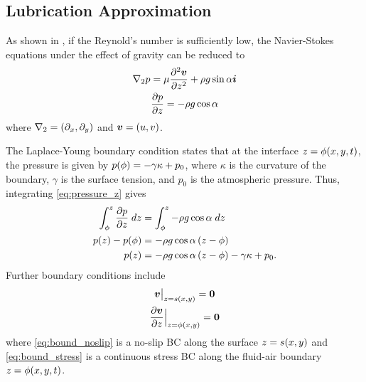 \subsection{Lubrication Approximation}
As shown in \cite{kondic2003instabilities}, if the Reynold's number is sufficiently low, the Navier-Stokes equations under the effect of gravity can be reduced to 
\begin{gather}
    \nabla_2 p = \mu \frac{\partial^2 \boldsymbol{v}}{\partial z^2} + \rho g \sin\alpha \boldsymbol{i} 
    \label{eq:pressure_grad}\\
    \frac{\partial p}{\partial z} = -\rho g \cos \alpha
    \label{eq:pressure_z}
\end{gather}
where $\nabla_2 = \left( \partial_x, \partial_y \right)$ and $\boldsymbol{v} = \left( u, v \right)$.

The Laplace-Young boundary condition states that at the interface $z = \phi\!\left( x, y, t \right)$, the pressure is given by 
$p\!\left( \phi \right) = -\gamma \kappa + p_0$, where $\kappa$ is the curvature of the boundary, $\gamma$ is the surface tension, and $p_0$ is the atmospheric pressure. 
Thus, integrating \cref{eq:pressure_z} gives 
\begin{align}
    \nonumber \int_{\phi}^{z} \frac{\partial p}{\partial z} \; dz &=  \int_{\phi}^{z} -\rho g \cos \alpha \; dz\\
    \nonumber p\!\left( z \right) - p\!\left( \phi \right) &= -\rho g \cos \alpha \left( z - \phi \right)\\
    p\!\left( z \right) &= -\rho g \cos \alpha \left( z - \phi \right) -\gamma \kappa + p_0.  
    \label{eq:laplace_young}
\end{align}
Further boundary conditions include 
\begin{gather}
    \evalat{\vect{v}}{z = s\lrp{x,y}} = \vect{0} 
    \label{eq:bound_noslip}\\
    \evalat[\Big]{\pderiv{\vect{v}}{z}}{z = \phi\lrp{x,y}} = \vect{0} 
    \label{eq:bound_stress}
\end{gather}
where \cref{eq:bound_noslip} is a no-slip BC along the surface $z = s\!\left( x,y \right)$ and \cref{eq:bound_stress}
is a continuous stress BC along the fluid-air boundary $z = \phi\!\left( x,y, t \right)$. 

